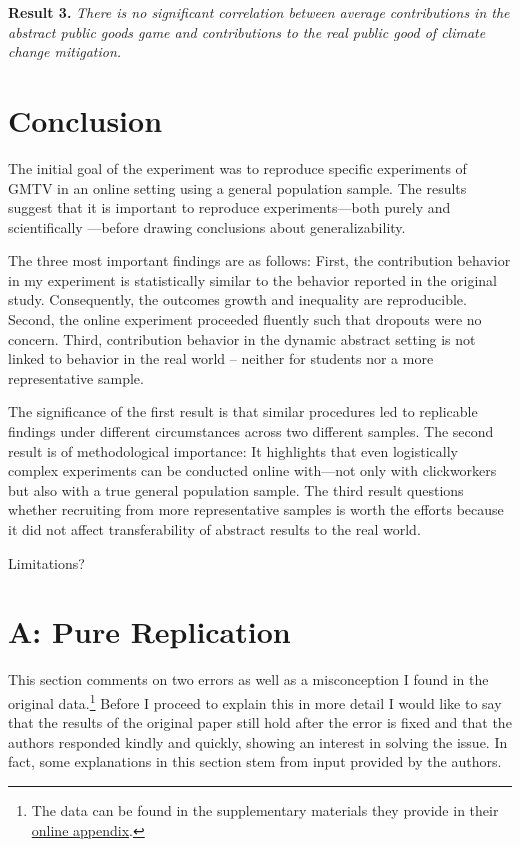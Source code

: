 \documentclass[
  authoryear,
  preprint,
  3p]{elsarticle}
\begin{document}
\textbf{Result 3.} \emph{There is no significant correlation between
average contributions in the abstract public goods game and
contributions to the real public good of climate change mitigation.}

\hypertarget{sec-conclusion}{%
\section{Conclusion}\label{sec-conclusion}}

The initial goal of the experiment was to reproduce specific experiments
of GMTV in an online setting using a general population sample. The
results suggest that it is important to reproduce experiments---both
purely and scientifically \citep[ p.~716]{Hamermesh2007}---before
drawing conclusions about generalizability.

The three most important findings are as follows: First, the
contribution behavior in my experiment is statistically similar to the
behavior reported in the original study. Consequently, the outcomes
growth and inequality are reproducible. Second, the online experiment
proceeded fluently such that dropouts were no concern. Third,
contribution behavior in the dynamic abstract setting is not linked to
behavior in the real world -- neither for students nor a more
representative sample.

The significance of the first result is that similar procedures led to
replicable findings under different circumstances across two different
samples. The second result is of methodological importance: It
highlights that even logistically complex experiments can be conducted
online with---not only with clickworkers but also with a true general
population sample. The third result questions whether recruiting from
more representative samples is worth the efforts because it did not
affect transferability of abstract results to the real world.

Limitations?

\newpage{}

\hypertarget{a-pure-replication}{%
\section{A: Pure Replication}\label{a-pure-replication}}

This section comments on two errors as well as a misconception I found
in the original data.\footnote{The data can be found in the
  supplementary materials they provide in their
  \href{https://www.sciencedirect.com/science/article/pii/S0047272717300361\#s0115}{online
  appendix}.} Before I proceed to explain this in more detail I would
like to say that the results of the original paper still hold after the
error is fixed and that the authors responded kindly and quickly,
showing an interest in solving the issue. In fact, some explanations in
this section stem from input provided by the authors.
\end{document}

